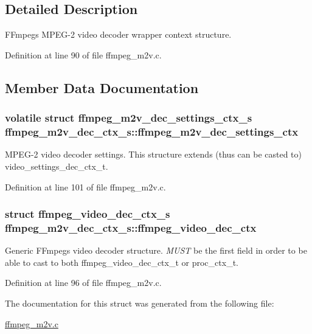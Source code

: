 \subsection{Detailed Description}
F\+Fmpeg\textquotesingle{}s M\+P\+E\+G-\/2 video decoder wrapper context structure. 

Definition at line 90 of file ffmpeg\+\_\+m2v.\+c.



\subsection{Member Data Documentation}
\subsubsection[{\texorpdfstring{ffmpeg\+\_\+m2v\+\_\+dec\+\_\+settings\+\_\+ctx}{ffmpeg_m2v_dec_settings_ctx}}]{\setlength{\rightskip}{0pt plus 5cm}volatile struct {\bf ffmpeg\+\_\+m2v\+\_\+dec\+\_\+settings\+\_\+ctx\+\_\+s} ffmpeg\+\_\+m2v\+\_\+dec\+\_\+ctx\+\_\+s\+::ffmpeg\+\_\+m2v\+\_\+dec\+\_\+settings\+\_\+ctx}\hypertarget{structffmpeg__m2v__dec__ctx__s_a58531cef90c2ecba9e0bdf167d9929e3}{}\label{structffmpeg__m2v__dec__ctx__s_a58531cef90c2ecba9e0bdf167d9929e3}
M\+P\+E\+G-\/2 video decoder settings. This structure extends (thus can be casted to) video\+\_\+settings\+\_\+dec\+\_\+ctx\+\_\+t. 

Definition at line 101 of file ffmpeg\+\_\+m2v.\+c.

\subsubsection[{\texorpdfstring{ffmpeg\+\_\+video\+\_\+dec\+\_\+ctx}{ffmpeg_video_dec_ctx}}]{\setlength{\rightskip}{0pt plus 5cm}struct {\bf ffmpeg\+\_\+video\+\_\+dec\+\_\+ctx\+\_\+s} ffmpeg\+\_\+m2v\+\_\+dec\+\_\+ctx\+\_\+s\+::ffmpeg\+\_\+video\+\_\+dec\+\_\+ctx}\hypertarget{structffmpeg__m2v__dec__ctx__s_ae526e60014d99bffe3c4e97b14352dcc}{}\label{structffmpeg__m2v__dec__ctx__s_ae526e60014d99bffe3c4e97b14352dcc}
Generic F\+Fmpeg\textquotesingle{}s video decoder structure. {\itshape M\+U\+ST} be the first field in order to be able to cast to both ffmpeg\+\_\+video\+\_\+dec\+\_\+ctx\+\_\+t or proc\+\_\+ctx\+\_\+t. 

Definition at line 96 of file ffmpeg\+\_\+m2v.\+c.



The documentation for this struct was generated from the following file\+:\begin{DoxyCompactItemize}
\item 
\hyperlink{ffmpeg__m2v_8c}{ffmpeg\+\_\+m2v.\+c}\end{DoxyCompactItemize}
